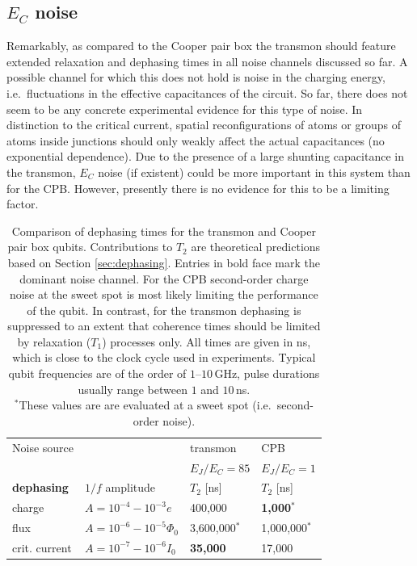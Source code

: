 \documentclass[twocolumn,amsmath,amssymb,floatfix,pra,showpacs,eqsecnum,footinbib,superscriptaddress]{revtex4}
\newcounter{fig}
\begin{document}
\subsection{$E_C$ noise}
Remarkably, as compared to the Cooper pair box the transmon should feature extended relaxation and dephasing times in all noise channels discussed so far. A possible channel for which this does not hold is noise in the charging energy, i.e.\ fluctuations in the effective capacitances of the circuit. So far, there does not seem to be any concrete experimental evidence for this type of noise. In distinction to the critical current, spatial reconfigurations of atoms or groups of atoms inside junctions should only weakly affect the actual capacitances (no exponential dependence). Due to the presence of a large shunting capacitance in the transmon, $E_C$ noise (if existent) could be more important in this system than for the CPB. However, presently there is no evidence for this to be a limiting factor.

\begin{table}[ht]
    \centering
      \begin{ruledtabular}\squeezetable 
        \begin{tabular}{llll}
        Noise source  && transmon  & CPB \\
        && $E_J/E_C=85$ & $E_J/E_C=1$ \\\hline\hline
        \textbf{dephasing} &$1/f$ amplitude &$T_2$ [ns] &$T_2$ [ns]  \\\hline
        charge & $A=10^{-4}-10^{-3}e$ \cite{zorin}  & 400,000  & \textbf{1,000}$^*$ \\
        flux & $A=10^{-6}-10^{-5}\Phi_0$ \cite{wellstood,yoshihara}  & 3,600,000$^*$ & 1,000,000$^*$ \\
        crit. current & $A=10^{-7}-10^{-6}I_0$ \cite{harlingen} & \textbf{35,000}  & 17,000
        \end{tabular}
        \end{ruledtabular}
        \caption{Comparison of dephasing times for the transmon and Cooper pair box qubits. Contributions to  $T_2$   are theoretical predictions based on Section \ref{sec:dephasing}. Entries in bold face mark the dominant noise channel. For the CPB second-order charge noise at the sweet spot is most likely limiting the performance of the qubit. In contrast, for the transmon dephasing is suppressed to an extent that coherence times should be limited by relaxation ($T_1$) processes only.  All times are given in ns, which is close to the clock cycle used in experiments. Typical qubit frequencies are of the order of $1$--$10\,$GHz, pulse durations usually range between $1$ and $10\,$ns.\\\noindent
        $^*$These values are are evaluated at a sweet spot (i.e.\ second-order noise).         \label{tab1}}
\end{table}
\end{document}
